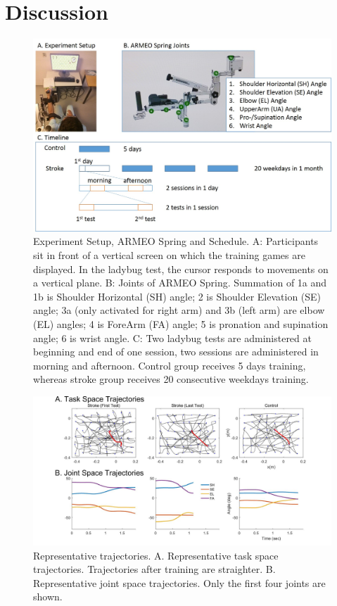 \section{Discussion}



\begin{figure}
	\centering
	\includegraphics[width=1\linewidth]{figures/1setup&schedule}
	\caption[Experiment Setup and Schedule]
	{Experiment Setup, ARMEO Spring and Schedule. 
		A: Participants sit in front of a vertical screen on which the training games are displayed. In the ladybug test, the cursor responds to movements on a vertical plane. 
		B: Joints of ARMEO Spring. Summation of 1a and 1b is Shoulder Horizontal (SH) angle; 2 is Shoulder Elevation (SE) angle; 3a (only activated for right arm) and 3b (left arm) are elbow (EL) angles; 4 is ForeArm (FA) angle; 5 is pronation and supination angle; 6 is wrist angle.
		C: Two ladybug tests are administered at beginning and end of one session, two sessions are administered in morning and afternoon. Control group receives 5 days training, whereas stroke group receives 20 consecutive weekdays training.}
	\label{fig:1setupschedule}
\end{figure}

\begin{figure}
	\centering
	\includegraphics[width=1\linewidth]{figures/2strokeTrajExamp}
	\caption[Example trajectories]
	{Representative trajectories. 
		A. Representative task space trajectories. Trajectories after training are straighter.
		B. Representative joint space trajectories. Only the first four joints are shown.}
	\label{fig:2stroketrajexamp}
\end{figure}


